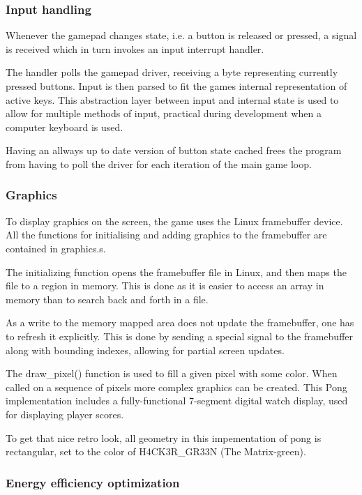 \subsubsection{Input handling}
Whenever the gamepad changes state, i.e. a button is released or pressed,
a signal is received which in turn invokes an input interrupt handler.

The handler polls the gamepad driver, receiving a byte representing currently
pressed buttons. Input is then parsed to fit the games internal representation
of active keys. This abstraction layer between input and internal state is used
to allow for multiple methods of input, practical during development when a
computer keyboard is used.

Having an allways up to date version of button state cached frees the program
from having to poll the driver for each iteration of the main game loop.

\subsubsection{Graphics}
To display graphics on the screen, the game uses the Linux framebuffer device.
All the functions for initialising and adding graphics to the framebuffer are
contained in graphics.s.

The initializing function opens the framebuffer file in Linux, and then maps the
file to a region in memory. This is done as it is easier to access an array in memory
than to search back and forth in a file.

As a write to the memory mapped area does not update the framebuffer,
one has to refresh it explicitly.
This is done by sending a special signal to the framebuffer
along with bounding indexes, allowing for partial screen updates.

The draw\_pixel() function is used to fill a given pixel with some color.
When called on a sequence of pixels more complex graphics can be created.
This Pong implementation includes a fully-functional 7-segment digital watch display,
used for displaying player scores.

To get that nice retro look, all geometry in this impementation of pong is rectangular,
set to the color of H4CK3R\_GR33N (The Matrix-green).

\subsubsection{Energy efficiency optimization}
